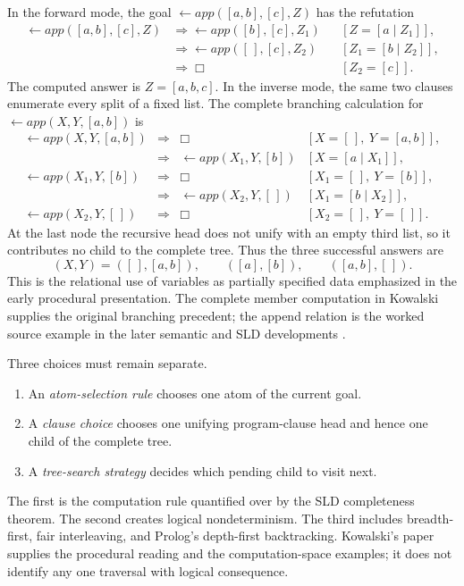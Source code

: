 In the forward mode, the goal
\(\leftarrow\mathit{app}([a,b],[c],Z)\) has the refutation
\[
\begin{aligned}
 \leftarrow\mathit{app}([a,b],[c],Z)
 &\Longrightarrow
 \leftarrow\mathit{app}([b],[c],Z_1)
   &&[Z=[a\mid Z_1]],\\
 &\Longrightarrow
 \leftarrow\mathit{app}([\,],[c],Z_2)
   &&[Z_1=[b\mid Z_2]],\\
 &\Longrightarrow\Box
   &&[Z_2=[c]].
\end{aligned}
\]
The computed answer is \(Z=[a,b,c]\).  In the inverse mode, the same two
clauses enumerate every split of a fixed list.  The complete branching
calculation for
\(\leftarrow\mathit{app}(X,Y,[a,b])\) is
\[
\begin{array}{rcll}
 \leftarrow\mathit{app}(X,Y,[a,b])
 &\Longrightarrow&\Box
   &[X=[\,],\ Y=[a,b]],\\
 &\Longrightarrow&
   \leftarrow\mathit{app}(X_1,Y,[b])
   &[X=[a\mid X_1]],\\[2pt]
 \leftarrow\mathit{app}(X_1,Y,[b])
 &\Longrightarrow&\Box
   &[X_1=[\,],\ Y=[b]],\\
 &\Longrightarrow&
   \leftarrow\mathit{app}(X_2,Y,[\,])
   &[X_1=[b\mid X_2]],\\[2pt]
 \leftarrow\mathit{app}(X_2,Y,[\,])
 &\Longrightarrow&\Box
   &[X_2=[\,],\ Y=[\,]].
\end{array}
\]
At the last node the recursive head does not unify with an empty third list, so
it contributes no child to the complete tree.
Thus the three successful answers are
\[
 (X,Y)=([\,],[a,b]),\qquad([a],[b]),\qquad([a,b],[\,]).
\]
This is the relational use of variables as partially specified data emphasized
in the early procedural presentation.  The complete member computation in
Kowalski supplies the original branching precedent; the append relation is the
worked source example in the later semantic and SLD developments
\cite[printed pp.~570--573]{Kowalski1974}
\cite{VanEmdenKowalski1976,AptVanEmden1982}.

Three choices must remain separate.
\begin{enumerate}
\item An \emph{atom-selection rule} chooses one atom of the current goal.
\item A \emph{clause choice} chooses one unifying program-clause head and hence
  one child of the complete tree.
\item A \emph{tree-search strategy} decides which pending child to visit next.
\end{enumerate}
The first is the computation rule quantified over by the SLD completeness
theorem.  The second creates logical nondeterminism.  The third includes
breadth-first, fair interleaving, and Prolog's depth-first backtracking.
Kowalski's paper supplies the procedural reading and the computation-space
examples; it does not identify any one traversal with logical consequence.

